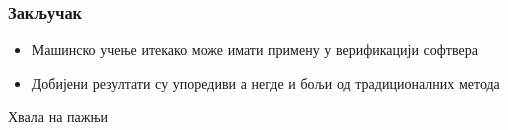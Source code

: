 \documentclass{beamer}
\begin{document}
\begin{frame}
\frametitle{Закључак}
\begin{itemize}
    \item Машинско учење итекако може имати примену у верификацији софтвера
    \item Добијени резултати су упоредиви а негде и бољи од традиционалних метода
\end{itemize}
\end{frame}
\begin{frame}
\Huge{\centerline{Хвала на пажњи}}
\end{frame}



\end{document}
